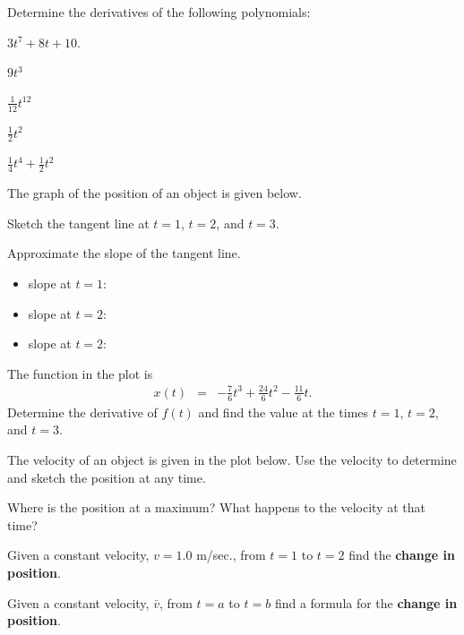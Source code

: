 \begin{problem}
\item Determine the derivatives of the following polynomials:
  \begin{subproblem}
    \item $3 t^7 +8 t + 10 $.
      \vfill
    \item $9t^3$
      \vfill
    \item $\frac{1}{12} t^{12}$
      \vfill
    \item $\frac{1}{2} t^{2}$
      \vfill
    \item $\frac{1}{4} t^{4}+\frac{1}{2}t^2$
      \vfill
  \end{subproblem}
  \clearpage

\item The graph of the position of an object is given below.

  \scalebox{0.6}{}

  \begin{subproblem}
  \item Sketch the tangent line at $t=1$, $t=2$, and $t=3$.
  \item Approximate the slope of the tangent line.
    \begin{itemize}
    \item slope at $t=1$:
    \item slope at $t=2$:
    \item slope at $t=2$:
    \end{itemize}
  \item The function in the plot is 
    \begin{eqnarray*}
      x(t) & = & -\frac{7}{6} t^3 + \frac{24}{6} t^2 - \frac{11}{6} t.
    \end{eqnarray*}
    Determine the derivative of $f(t)$ and find the value at the times
    $t=1$, $t=2$, and $t=3$.
    \vfill
  \end{subproblem}
  \clearpage

\item The velocity of an object is given in the plot below. Use the
  velocity to determine and sketch the position at any time.

  \scalebox{0.7}{}


  \begin{subproblem}
  \item Where is the position at a maximum? What happens to the
    velocity at that time? 
    \vspace{3em}
  \item Given a constant velocity, $v=1.0$ m/sec., from $t=1$ to $t=2$
    find the \textbf{change in position}.  
    \vfill
  \item Given a constant velocity, $\bar{v}$, from $t=a$ to $t=b$ find
    a formula for the \textbf{change in position}.
    \vfill
  \end{subproblem}

\end{problem}


